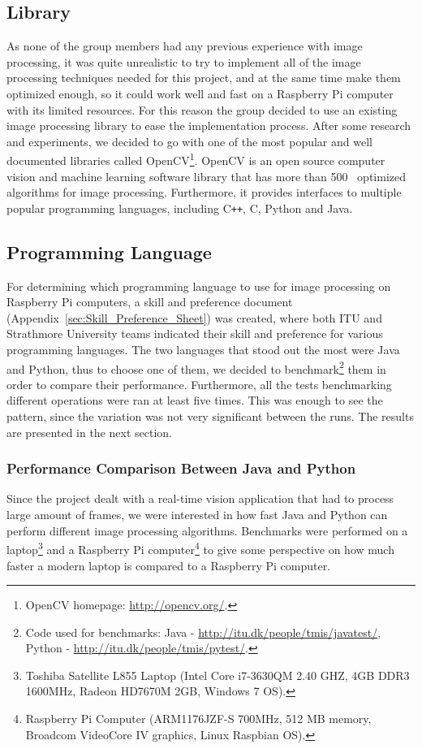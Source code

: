 
\subsection{Library}
As none of the group members had any previous experience with image processing, it was quite unrealistic to try to implement all of the image processing techniques needed for this project, and at the same time make them optimized enough, so it could work well and fast on a Raspberry Pi computer with its limited resources. For this reason the group decided to use an existing image processing library to ease the implementation process. After some research and experiments, we decided to go with one of the most popular and well documented libraries called OpenCV\footnote{OpenCV homepage: \url{http://opencv.org/}.}. OpenCV is an open source computer vision and machine learning software library that has more than 500~\cite{opencv_1} optimized algorithms for image processing. Furthermore, it provides interfaces to multiple popular programming languages, including C\texttt{++}, C, Python and Java.

\subsection{Programming Language}
For determining which programming language to use for image processing on Raspberry Pi computers, a skill and preference document (Appendix~\ref{sec:Skill_Preference_Sheet}) was created, where both ITU and Strathmore University teams indicated their skill and preference for various programming languages. The two languages that stood out the most were Java and Python, thus to choose one of them, we decided to benchmark\footnote{Code used for benchmarks: Java - \url{http://itu.dk/people/tmis/javatest/}, Python - \url{http://itu.dk/people/tmis/pytest/}.} them in order to compare their performance. Furthermore, all the tests benchmarking different operations were ran at least five times. This was enough to see the pattern, since the variation was not very significant between the runs. The results are presented in the next section.

\subsubsection{Performance Comparison Between Java and Python}
Since the project dealt with a real-time vision application that had to process large amount of frames, we were interested in how fast Java and Python can perform different image processing algorithms. Benchmarks were performed on a laptop\footnote{Toshiba Satellite L855 Laptop (Intel Core i7-3630QM 2.40 GHZ, 4GB DDR3 1600MHz, Radeon HD7670M 2GB, Windows 7 OS).} and a Raspberry Pi computer\footnote{Raspberry Pi Computer (ARM1176JZF-S 700MHz, 512 MB memory, Broadcom VideoCore IV graphics, Linux Raspbian OS).} to give some perspective on how much faster a modern laptop is compared to a Raspberry Pi computer.

